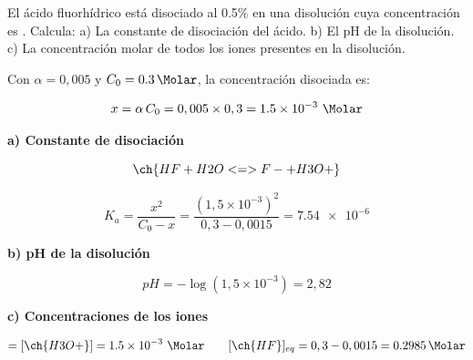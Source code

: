 \begin{exerciseEVAU}
    El ácido fluorhídrico está disociado al \num{0.5}\% en una disolución cuya concentración es . Calcula: a) La constante de disociación del ácido. b) El pH de la disolución. c) La concentración molar de todos los iones presentes en la disolución.



    \begin{solu}


        Con \(\alpha = 0,005\) y \(C_0 = \SI{0.3}{\Molar}\), la concentración disociada es:

        \begin{equation*}
            x = \alpha\, C_0 = 0,005\times0,3 = \num{1.5e-3} \ \si{\Molar}
        \end{equation*}

        \textbf{a) Constante de disociación}

        \begin{equation*}
            \ch{HF + H2O <=> F- + H3O+}
        \end{equation*}

        \begin{equation*}
            K_a = \dfrac{x^2}{C_0-x} = \dfrac{(1,5\times10^{-3})^2}{0,3-0,0015} = \num{7.54e-6}
        \end{equation*}

        \textbf{b) pH de la disolución}

        \begin{equation*}
            pH = -\log(1,5\times10^{-3}) = 2,82
        \end{equation*}

        \textbf{c) Concentraciones de los iones}

        \begin{equation*}
            [\ch{F-}] = [\ch{H3O+}] = \num{1.5e-3} \ \si{\Molar} \qquad [\ch{HF}]_{eq} = 0,3-0,0015 = \SI{0.2985}{\Molar}
        \end{equation*}

    \end{solu}
\end{exerciseEVAU}

